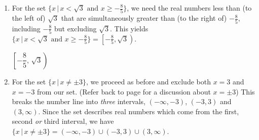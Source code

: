 \documentclass{ximera}
\begin{document}
\begin{example}
\begin{explanation}
\begin{enumerate}
\begin{enumerate}
\begin{center}

\vspace{0.5em}

$(-\infty,-2]\cup[2,\infty)$

\end{center}

\item For the set $\{ x \, | \, x < \sqrt{3} \,\,  \text{and} \,\, x \geq -\frac{8}{5} \}$, we need the real numbers less than (to the left of) $\sqrt{3}$ that are simultaneously greater than (to the right of) $-\frac{8}{5}$, including $-\frac{8}{5}$ but excluding $\sqrt{3}$.  This yields $\{ x \, | \, x < \sqrt{3} \,\,  \text{and} \,\, x \geq -\frac{8}{5} \} = \left[ -\frac{8}{5}, \sqrt{3} \right)$.
 
\begin{center}


\vspace{0.5em}

$\left[-\dfrac{8}{5},\,\sqrt{3}\right)$

\end{center}

\item  For the set $\{ x \, | \, x \neq \pm 3 \}$, we proceed as before and exclude both $x=3$ and $x=-3$ from our set. (Refer back to page \pageref{setsofnumbersboxonthispage} for a discussion about $x = \pm 3$)  This breaks the number line into \textit{three} intervals, $(-\infty, -3)$, $(-3,3)$ and $(3, \infty)$.   Since the set describes real numbers which come from the first, second \textit{or} third interval, we have $\{ x \, | \, x \neq \pm 3 \} = (-\infty, -3) \cup (-3,3) \cup (3, \infty)$.



\end{enumerate}
\end{enumerate}
\end{explanation}
\end{example}
\end{document}
